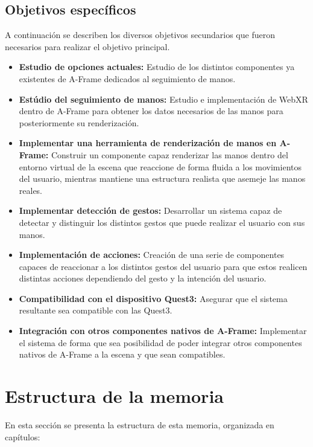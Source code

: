 \documentclass[a4paper, 12pt]{book}
\begin{document}
\subsection{Objetivos específicos}
\label{subsec:objetivos-especificos}
A continuación se describen los diversos objetivos secundarios que fueron necesarios para realizar el objetivo principal.
\begin{itemize}
  \item \textbf{Estudio de opciones actuales:} Estudio de los distintos componentes ya existentes de A-Frame dedicados al seguimiento de manos.
  \item \textbf{Estúdio del seguimiento de manos:} Estudio e implementación de WebXR dentro de A-Frame para obtener los datos necesarios de las manos para posteriormente su renderización.
  \item \textbf{Implementar una herramienta de renderización de manos en A-Frame:} Construir un componente capaz renderizar las manos dentro del entorno virtual de la escena que reaccione de forma fluida a los movimientos del usuario, mientras mantiene una estructura realista que asemeje las manos reales. 
  \item \textbf{Implementar detección de gestos:} Desarrollar un sistema capaz de detectar y distinguir los distintos gestos que puede realizar el usuario con sus manos.
  \item \textbf{Implementación de acciones:} Creación de una serie de componentes capaces de reaccionar a los distintos gestos del usuario para que estos realicen distintas acciones dependiendo del gesto y la intención del usuario. 
  \item \textbf{Compatibilidad con el dispositivo Quest3:} Asegurar que el sistema resultante sea compatible con las Quest3.
  \item \textbf{Integración con otros componentes nativos de A-Frame:} Implementar el sistema de forma que sea posibilidad de poder integrar otros componentes nativos de A-Frame a la escena y que sean compatibles.
\end{itemize}

\section{Estructura de la memoria}
\label{subsec:estructura}
En esta sección se presenta la estructura de esta memoria, organizada en capítulos:
\end{document}
